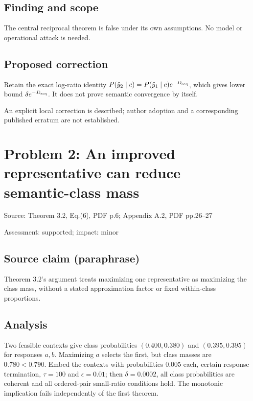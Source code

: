 \documentclass[11pt]{article}
\begin{document}
\subsection*{Finding and scope}

The central reciprocal theorem is false under its own assumptions. No model or operational attack is needed.

\subsection*{Proposed correction}

Retain the exact log-ratio identity \(P(\hat y_2\mid c)=P(\hat y_1\mid c)e^{-D_{\rm seq}}\), which gives lower bound \(\delta e^{-D_{\rm seq}}\). It does not prove semantic convergence by itself.

An explicit local correction is described; author adoption and a corresponding published erratum are not established.

\section*{Problem 2: An improved representative can reduce semantic-class mass}

Source: Theorem 3.2, Eq.(6), PDF p.6; Appendix A.2, PDF pp.26–27

Assessment: supported; impact: minor

\subsection*{Source claim (paraphrase)}

Theorem 3.2’s argument treats maximizing one representative as maximizing the class mass, without a stated approximation factor or fixed within-class proportions.

\subsection*{Analysis}

Two feasible contexts give class probabilities \((0.400,0.380)\) and \((0.395,0.395)\) for responses \(a,b\). Maximizing \(a\) selects the first, but class masses are \(0.780<0.790\). Embed the contexts with probabilities \(0.005\) each, certain response termination, \(\tau=100\) and \(\epsilon=0.01\); then \(\delta=0.0002\), all class probabilities are coherent and all ordered-pair small-ratio conditions hold. The monotonic implication fails independently of the first theorem.
\end{document}
